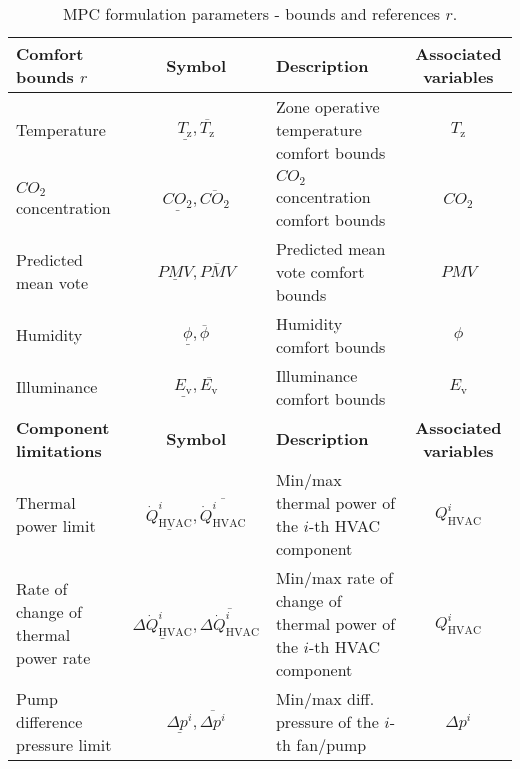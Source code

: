 \documentclass[10pt]{extarticle}
\begin{document}
\renewcommand{\arraystretch}{2}
\begin{table}[ht]
	\centering
	\caption{MPC formulation parameters - bounds and references $r$.}
	\label{tab:mpc_form:parameters:bounds}
		\begin{adjustwidth}{-1.5cm}{}
	\begin{tabular}{l|c|l|c}
		\toprule
		\textbf{Comfort bounds $r$}  & \textbf{Symbol} &  \textbf{Description} & \textbf{Associated variables} \\
		\midrule
		Temperature & $\underline{T_{\text{z}}},\overline{T_{\text{z}}}$ & \makecell[l]{Zone operative temperature  \\ comfort bounds } & $T_{\text{z}}$ \\
		$CO_2$ concentration & $\underline{CO_2},\overline{CO_2}$ & \makecell[l]{$CO_2$ concentration comfort \\ bounds} & $CO_{2}$ \\
		Predicted mean vote & $\underline{PMV},\overline{PMV}$ &  \makecell[l]{Predicted mean vote comfort \\ bounds} & $PMV$ \\
		Humidity & $\underline{\phi},\overline{\phi}$ &  Humidity comfort bounds & $\phi$  \\
		Illuminance & $\underline{E_{\text{v}}},\overline{E_{\text{v}}}$ & Illuminance comfort bounds & $E_{\text{v}}$  \\
		\bottomrule 
		\textbf{Component limitations}  & \textbf{Symbol} &  \textbf{Description} & \textbf{Associated variables} \\
		\midrule
		Thermal power limit & $\underline{\dot{Q}^i_{\text{HVAC}}},\overline{\dot{Q}^i_{\text{HVAC}}}$ & \makecell[l]{Min/max thermal power of \\ the $i$-th HVAC component} & $Q^i_{\text{HVAC}}$ \\
		\makecell[l]{Rate of change of\\ thermal power rate}  & $\underline{\Delta \dot{Q}^i_{\text{HVAC}}},\overline{\Delta \dot{Q}^i_{\text{HVAC}}}$ & \makecell[l]{Min/max rate of change of  thermal  \\ power  of the  $i$-th HVAC component} & $Q^i_{\text{HVAC}}$ \\
		\makecell[l]{Pump difference\\ pressure limit}   & $\underline{\Delta p^i},\overline{\Delta p^i}$ & \makecell[l]{Min/max diff. pressure \\  of the  $i$-th fan/pump} & $\Delta p^i$ \\

\end{tabular}
\end{adjustwidth}
\end{table}
\end{document}
